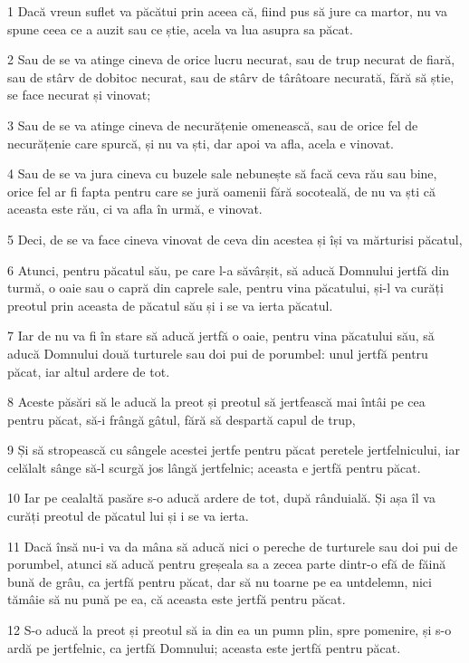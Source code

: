 \par 1 Dacă vreun suflet va păcătui prin aceea că, fiind pus să jure ca martor, nu va spune ceea ce a auzit sau ce știe, acela va lua asupra sa păcat.
\par 2 Sau de se va atinge cineva de orice lucru necurat, sau de trup necurat de fiară, sau de stârv de dobitoc necurat, sau de stârv de târâtoare necurată, fără să știe, se face necurat și vinovat;
\par 3 Sau de se va atinge cineva de necurățenie omenească, sau de orice fel de necurățenie care spurcă, și nu va ști, dar apoi va afla, acela e vinovat.
\par 4 Sau de se va jura cineva cu buzele sale nebunește să facă ceva rău sau bine, orice fel ar fi fapta pentru care se jură oamenii fără socoteală, de nu va ști că aceasta este rău, ci va afla în urmă, e vinovat.
\par 5 Deci, de se va face cineva vinovat de ceva din acestea și își va mărturisi păcatul,
\par 6 Atunci, pentru păcatul său, pe care l-a săvârșit, să aducă Domnului jertfă din turmă, o oaie sau o capră din caprele sale, pentru vina păcatului, și-l va curăți preotul prin aceasta de păcatul său și i se va ierta păcatul.
\par 7 Iar de nu va fi în stare să aducă jertfă o oaie, pentru vina păcatului său, să aducă Domnului două turturele sau doi pui de porumbel: unul jertfă pentru păcat, iar altul ardere de tot.
\par 8 Aceste păsări să le aducă la preot și preotul să jertfească mai întâi pe cea pentru păcat, să-i frângă gâtul, fără să despartă capul de trup,
\par 9 Și să stropească cu sângele acestei jertfe pentru păcat peretele jertfelnicului, iar celălalt sânge să-l scurgă jos lângă jertfelnic; aceasta e jertfă pentru păcat.
\par 10 Iar pe cealaltă pasăre s-o aducă ardere de tot, după rânduială. Și așa îl va curăți preotul de păcatul lui și i se va ierta.
\par 11 Dacă însă nu-i va da mâna să aducă nici o pereche de turturele sau doi pui de porumbel, atunci să aducă pentru greșeala sa a zecea parte dintr-o efă de făină bună de grâu, ca jertfă pentru păcat, dar să nu toarne pe ea untdelemn, nici tămâie să nu pună pe ea, că aceasta este jertfă pentru păcat.
\par 12 S-o aducă la preot și preotul să ia din ea un pumn plin, spre pomenire, și s-o ardă pe jertfelnic, ca jertfă Domnului; aceasta este jertfă pentru păcat.
